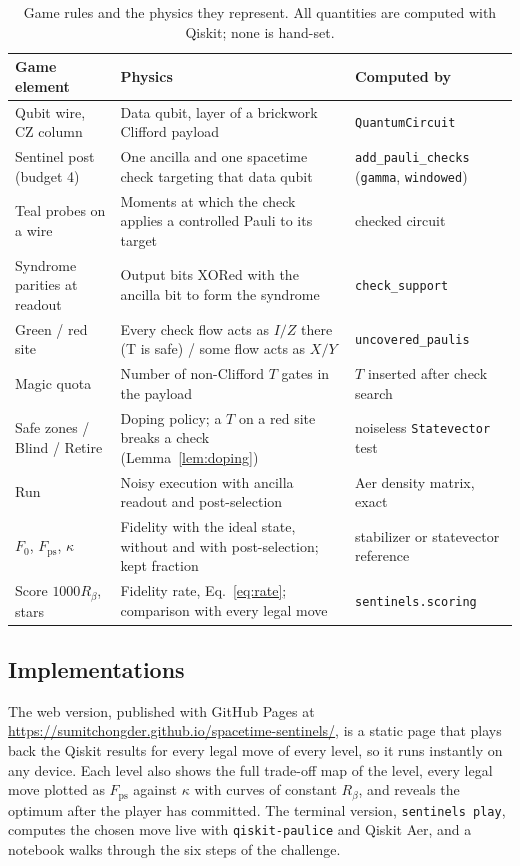 \begin{table}[t]
\caption{Game rules and the physics they represent. All quantities are computed with Qiskit; none is hand-set.}
\label{tab:map}
\begin{ruledtabular}
\begin{tabular}{p{}p{}p{}}
Game element & Physics & Computed by \\
\hline
Qubit wire, CZ column & Data qubit, layer of a brickwork Clifford payload & \texttt{QuantumCircuit} \\
Sentinel post (budget 4) & One ancilla and one spacetime check targeting that data qubit & \texttt{add\_pauli\_checks} (\texttt{gamma}, \texttt{windowed}) \\
Teal probes on a wire & Moments at which the check applies a controlled Pauli to its target & checked circuit \\
Syndrome parities at readout & Output bits XORed with the ancilla bit to form the syndrome & \texttt{check\_support} \\
Green / red site & Every check flow acts as $I/Z$ there (T is safe) / some flow acts as $X/Y$ & \texttt{uncovered\_paulis} \\
Magic quota & Number of non-Clifford $T$ gates in the payload & $T$ inserted after check search \\
Safe zones / Blind / Retire & Doping policy; a $T$ on a red site breaks a check (Lemma~\ref{lem:doping}) & noiseless \texttt{Statevector} test \\
Run & Noisy execution with ancilla readout and post-selection & Aer density matrix, exact \\
$F_0$, $F_{\mathrm{ps}}$, $\kappa$ & Fidelity with the ideal state, without and with post-selection; kept fraction & stabilizer or statevector reference \\
Score $1000R_\beta$, stars & Fidelity rate, Eq.~\eqref{eq:rate}; comparison with every legal move & \texttt{sentinels.scoring} \\
\end{tabular}
\end{ruledtabular}
\end{table}

\subsection{Implementations}
The web version, published with GitHub Pages at \url{https://sumitchongder.github.io/spacetime-sentinels/}, is a static page that plays back the Qiskit results for every legal move of every level, so it runs instantly on any device. Each level also shows the full trade-off map of the level, every legal move plotted as $F_{\mathrm{ps}}$ against $\kappa$ with curves of constant $R_\beta$, and reveals the optimum after the player has committed. The terminal version, \texttt{sentinels play}, computes the chosen move live with \texttt{qiskit-paulice} and Qiskit Aer, and a notebook walks through the six steps of the challenge.

